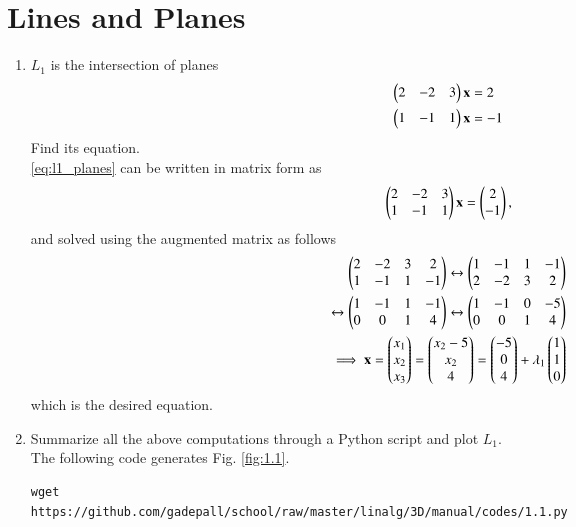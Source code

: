 \documentclass[journal,12pt,twocolumn]{IEEEtran}
\renewcommand\thesection{\arabic{section}}
\begin{document}
\section{Lines and Planes}
\begin{enumerate}[label=\thesection.\arabic*
,ref=\thesection.\theenumi]
\item  $L_1$ is the intersection of planes 
\begin{align}
\begin{split}
\begin{pmatrix}2 & -2 & 3\end{pmatrix}\mathbf{x} &= 2
\\
\begin{pmatrix}1 & -1 & 1\end{pmatrix}\mathbf{x} &= -1
\end{split}
\label{eq:l1_planes}
\end{align}
%
Find its equation.
\\
\solution \eqref{eq:l1_planes} can be written in matrix form as
\begin{align}
\begin{pmatrix}2 & -2 & 3 \\ 1 & -1 & 1\end{pmatrix}\mathbf{x} = \begin{pmatrix}2 \\ -1\end{pmatrix},
\end{align}
%
and solved using the augmented matrix as follows
\begin{align}
\begin{pmatrix}2 & -2 & 3 & 2\\ 1 & -1 & 1 & -1\end{pmatrix} \leftrightarrow \begin{pmatrix} 1 & -1 & 1 & -1 \\ 2 & -2 & 3 & 2\end{pmatrix}
\\
\leftrightarrow \begin{pmatrix} 1 & -1 & 1 & -1 \\ 0 & 0 & 1 & 4\end{pmatrix} \leftrightarrow \begin{pmatrix} 1 & -1 & 0 & -5 \\ 0 & 0 & 1 
& 4\end{pmatrix}
\\
\implies \mathbf{x} = \begin{pmatrix} x_1 \\ x_2 \\ x_3\end{pmatrix} = \begin{pmatrix} x_2-5 \\ x_2 \\ 4\end{pmatrix} = \begin{pmatrix} 
-5 \\ 0 \\ 4\end{pmatrix} + \lambda_1 \begin{pmatrix} 1 \\ 1 \\ 0\end{pmatrix}
\label{eq:l1}
\end{align}
%
which is the desired equation.
\item Summarize all the above computations through a Python script and plot 
$L_1$.
\\
\solution The following code generates Fig. \ref{fig:1.1}.
\begin{lstlisting}
wget 
https://github.com/gadepall/school/raw/master/linalg/3D/manual/codes/1.1.py
\end{lstlisting}

\end{enumerate}
\end{document}

